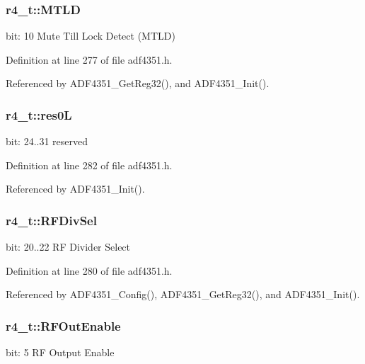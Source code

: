\subsubsection[{\texorpdfstring{M\+T\+LD}{MTLD}}]{ r4\+\_\+t\+::\+M\+T\+LD}\hypertarget{structr4__t_a899217c98d1c1eca8780186c8e44470c}{}\label{structr4__t_a899217c98d1c1eca8780186c8e44470c}
bit\+: 10 Mute Till Lock Detect (M\+T\+LD) 

Definition at line 277 of file adf4351.\+h.



Referenced by A\+D\+F4351\+\_\+\+Get\+Reg32(), and A\+D\+F4351\+\_\+\+Init().

\subsubsection[{\texorpdfstring{res0L}{res0L}}]{ r4\+\_\+t\+::res0L}\hypertarget{structr4__t_a39447a9d51f096493dfc6d4a38bf3f9e}{}\label{structr4__t_a39447a9d51f096493dfc6d4a38bf3f9e}
bit\+: 24..31 reserved 

Definition at line 282 of file adf4351.\+h.



Referenced by A\+D\+F4351\+\_\+\+Init().

\subsubsection[{\texorpdfstring{R\+F\+Div\+Sel}{RFDivSel}}]{ r4\+\_\+t\+::\+R\+F\+Div\+Sel}\hypertarget{structr4__t_a6f0ef612a55877310aa2f07c9737e66b}{}\label{structr4__t_a6f0ef612a55877310aa2f07c9737e66b}
bit\+: 20..22 RF Divider Select 

Definition at line 280 of file adf4351.\+h.



Referenced by A\+D\+F4351\+\_\+\+Config(), A\+D\+F4351\+\_\+\+Get\+Reg32(), and A\+D\+F4351\+\_\+\+Init().

\subsubsection[{\texorpdfstring{R\+F\+Out\+Enable}{RFOutEnable}}]{ r4\+\_\+t\+::\+R\+F\+Out\+Enable}\hypertarget{structr4__t_adf8eb2db5ffd584ec6c5b5496a90f0f5}{}\label{structr4__t_adf8eb2db5ffd584ec6c5b5496a90f0f5}
bit\+: 5 RF Output Enable 

